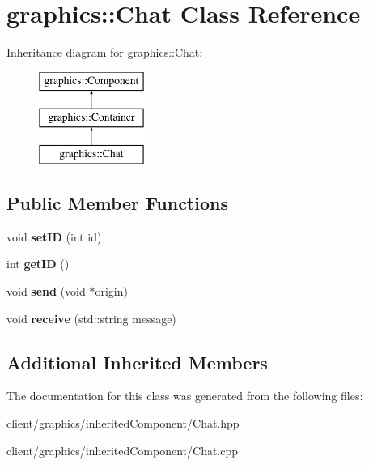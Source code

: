 \hypertarget{classgraphics_1_1_chat}{\section{graphics\-:\-:Chat Class Reference}
\label{classgraphics_1_1_chat}
}
Inheritance diagram for graphics\-:\-:Chat\-:\begin{figure}[H]
\begin{center}
\leavevmode
\includegraphics[height=3.000000cm]{classgraphics_1_1_chat}
\end{center}
\end{figure}
\subsection*{Public Member Functions}
\begin{DoxyCompactItemize}
\item 
\hypertarget{classgraphics_1_1_chat_a326fb6802e6aef437b670d38e90e34a3}{void {\bfseries set\-I\-D} (int id)}\label{classgraphics_1_1_chat_a326fb6802e6aef437b670d38e90e34a3}

\item 
\hypertarget{classgraphics_1_1_chat_a3cf7b0f62d1550cf78d323ce1b92531b}{int {\bfseries get\-I\-D} ()}\label{classgraphics_1_1_chat_a3cf7b0f62d1550cf78d323ce1b92531b}

\item 
\hypertarget{classgraphics_1_1_chat_ace61fd926a0cc1600514c7a5fa3e2344}{void {\bfseries send} (void $\ast$origin)}\label{classgraphics_1_1_chat_ace61fd926a0cc1600514c7a5fa3e2344}

\item 
\hypertarget{classgraphics_1_1_chat_a080320c3289586cf6bec2fc8f09b4ad3}{void {\bfseries receive} (std\-::string message)}\label{classgraphics_1_1_chat_a080320c3289586cf6bec2fc8f09b4ad3}

\end{DoxyCompactItemize}
\subsection*{Additional Inherited Members}


The documentation for this class was generated from the following files\-:\begin{DoxyCompactItemize}
\item 
client/graphics/inherited\-Component/Chat.\-hpp\item 
client/graphics/inherited\-Component/Chat.\-cpp\end{DoxyCompactItemize}
